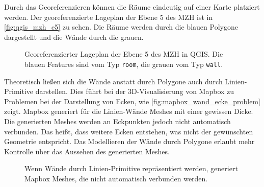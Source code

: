 Durch das Georeferenzieren können die Räume eindeutig auf einer Karte platziert werden.
Der georeferenzierte Lageplan der Ebene 5 des MZH ist in \autoref{fig:qgis_mzh_e5} zu sehen.
Die Räume werden durch die blauen Polygone dargestellt und die Wände durch die grauen.

\begin{figure}
    \centering
    \caption{Georeferenzierter Lageplan der Ebene 5 des MZH in QGIS.\@ %
    Die blauen Features sind vom Typ \lstinline{room}, die grauen vom Typ \lstinline{wall}.}
    \label{fig:qgis_mzh_e5}
\end{figure}

Theoretisch ließen sich die Wände anstatt durch Polygone auch durch Linien-Primitive darstellen.
Dies führt bei der 3D-Visualisierung von Mapbox zu Problemen bei der Darstellung von Ecken, wie \autoref{fig:mapbox_wand_ecke_problem} zeigt.
Mapbox generiert für die Linien-Wände Meshes mit einer gewissen Dicke.
Die generierten Meshes werden an Eckpunkten jedoch nicht automatisch verbunden.
Das heißt, dass weitere Ecken entstehen, was nicht der gewünschten Geometrie entspricht.
Das Modellieren der Wände durch Polygone erlaubt mehr Kontrolle über das Aussehen des generierten Meshes.

\begin{figure}
    \centering
    \vspace{2em}
    \caption{Wenn Wände durch Linien-Primitive repräsentiert werden, generiert Mapbox Meshes, die nicht automatisch verbunden werden.}
    \label{fig:mapbox_wand_ecke_problem}
\end{figure}

